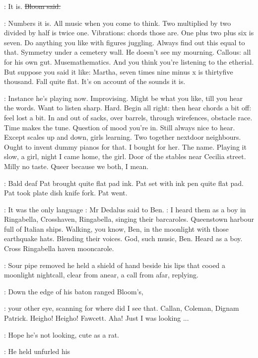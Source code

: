 \Bloom:
It is.
\sout{Bloom said.}

\BloomInt:
Numbers it is.
All music when you come to think. Two multiplied by two
divided by half is twice one. Vibrations: chords those are. One plus two
plus six is seven. Do anything you like with figures juggling. Always find
out this equal to that. Symmetry under a cemetery wall. He doesn't see my
mourning. Callous: all for his own gut. Musemathematics. And you think
you're listening to the etherial. But suppose you said it like: Martha,
seven times nine minus x is thirtyfive thousand. Fall quite flat. It's on
account of the sounds it is.

\BloomInt:
Instance he's playing now. Improvising. Might be what you like, till
you hear the words. Want to listen sharp. Hard. Begin all right: then hear
chords a bit off: feel lost a bit.
In and out of sacks, over barrels,
through wirefences, obstacle race. Time makes the tune. Question of mood
you're in. Still always nice to hear. Except scales up and down, girls
learning. Two together nextdoor neighbours. Ought to invent dummy pianos
for that.
I bought for her. The name. Playing it slow, a girl,
night I came home, the girl. Door of the stables near Cecilia street.
Milly no taste. Queer because we both, I mean.

:
Bald deaf Pat brought quite flat pad ink. Pat set with ink pen quite
flat pad. Pat took plate dish knife fork. Pat went.

\simon:
It was the only language
:
Mr Dedalus said to Ben.
\simon:
I heard them as a
boy in Ringabella, Crosshaven, Ringabella,
singing their barcaroles.
Queenstown harbour full of Italian ships. Walking, you know, Ben, in the
moonlight with those earthquake hats. Blending their voices. God, such
music, Ben. Heard as a boy.
Cross Ringabella haven mooncarole.

:
Sour pipe removed he held a shield of hand beside his lips that cooed
a moonlight nightcall, clear from anear, a call from afar, replying.

:
Down the edge of his  baton ranged Bloom's,

\BloomInt:
your other eye,
scanning for where did I see that.
Callan, Coleman, Dignam Patrick.
Heigho!
Heigho!
Fawcett.
Aha!
Just I was looking ...

\BloomInt:
Hope he's not looking, cute as a rat.

:
He held unfurled his 

